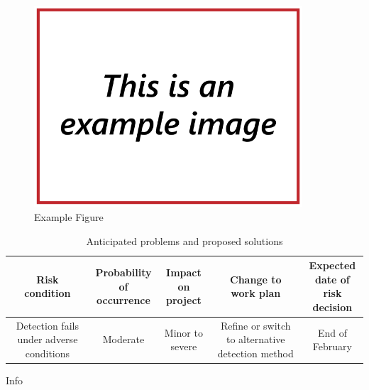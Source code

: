 \begin{figure}
\includegraphics[width=100mm,natwidth=640,natheight=480]{"./image/Example"}
\caption{\label{fig:example}Example Figure}
\end{figure}



\begin{table}
\caption{\label{tab:contingency}Anticipated problems and proposed solutions}
\begin{tabular}{c|c|c|c|c}

\parbox[t]{2cm}{Risk\\condition} & \parbox[t]{2.5cm}{Probability\\of occurrence} & \parbox[t]{3cm}{Impact on\\project} & \parbox[t]{3cm}{Change to\\work plan} & \parbox[t]{2.4cm}{Expected\\date of risk\\decision}\\[1.6cm]
\hline

\parbox[t]{2cm}{Detection fails under adverse conditions}&
\parbox[t]{2.5cm}{Moderate}&
\parbox[t]{3cm}{Minor to severe}&
\parbox[t]{3cm}{Refine or switch to alternative detection method}&
\parbox[t]{2.4cm}{End of February}\\

\end{tabular}
\end{table}


 Info
\cite{label}
